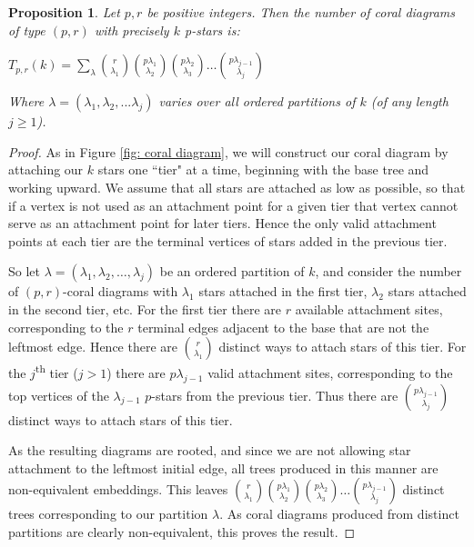 \documentclass[documentfleqn,12pt]{amsart}
\newtheorem{proposition}[theorem]{Proposition}
\begin{document}
\begin{proposition}
\label{thm: coral enumeration partitions}
Let $p,r$ be positive integers.  Then the number of coral diagrams of type $(p,r)$ with precisely $k$ p-stars is:

\begin{center}
$\displaystyle{T_{p,r}(k) = \sum_\lambda \binom{r}{\lambda_1} \binom{p \lambda_1}{\lambda_2} \binom{p \lambda_2}{\lambda_3} \hdots \binom{p \lambda_{j-1}}{\lambda_j}}$
\end{center}

\noindent Where $\lambda = (\lambda_1,\lambda_2,...\lambda_j)$ varies over all ordered partitions of $k$ (of any length $j \geq 1$).
\end{proposition}
\begin{proof}
As in Figure \ref{fig: coral diagram}, we will construct our coral diagram by attaching our $k$ stars one ``tier" at a time, beginning with the base tree and working upward.  We assume that all stars are attached as low as possible, so that if a vertex is not used as an attachment point for a given tier that vertex cannot serve as an attachment point for later tiers.  Hence the only valid attachment points at each tier are the terminal vertices of stars added in the previous tier.

So let $\lambda = (\lambda_1, \lambda_2, \hdots, \lambda_j)$ be an ordered partition of $k$, and consider the number of $(p,r)$-coral diagrams with $\lambda_1$ stars attached in the first tier, $\lambda_2$ stars attached in the second tier, etc.  For the first tier there are $r$ available attachment sites, corresponding to the $r$ terminal edges adjacent to the base that are not the leftmost edge.  Hence there are $\binom{r}{\lambda_1}$ distinct ways to attach stars of this tier.  For the $j$\textsuperscript{th} tier ($j > 1$) there are $p \lambda_{j-1}$ valid attachment sites, corresponding to the top vertices of the $\lambda_{j-1}$ $p$-stars from the previous tier.  Thus there are $\binom{p \lambda_{j-1}}{\lambda_j}$ distinct ways to attach stars of this tier.

As the resulting diagrams are rooted, and since we are not allowing star attachment to the leftmost initial edge, all trees produced in this manner are non-equivalent embeddings.  This leaves $\binom{r}{\lambda_1} \binom{p \lambda_1}{\lambda_2} \binom{p \lambda_2}{\lambda_3} \hdots \binom{p \lambda_{j-1}}{\lambda_j}$ distinct trees corresponding to our partition $\lambda$.  As coral diagrams produced from distinct partitions are clearly non-equivalent, this proves the result.
\end{proof}
\end{document}
